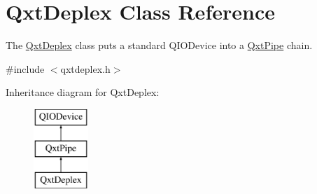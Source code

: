 \hypertarget{class_qxt_deplex}{\section{Qxt\-Deplex Class Reference}
\label{class_qxt_deplex}
}


The \hyperlink{class_qxt_deplex}{Qxt\-Deplex} class puts a standard Q\-I\-O\-Device into a \hyperlink{class_qxt_pipe}{Qxt\-Pipe} chain.  




{\ttfamily \#include $<$qxtdeplex.\-h$>$}

Inheritance diagram for Qxt\-Deplex\-:\begin{figure}[H]
\begin{center}
\leavevmode
\includegraphics[height=3.000000cm]{class_qxt_deplex}
\end{center}
\end{figure}
